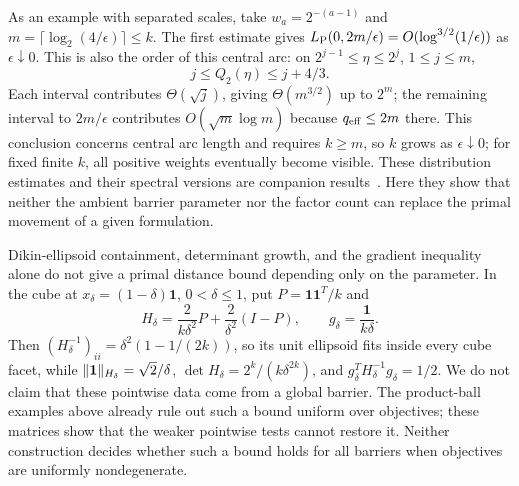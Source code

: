 As an example with separated scales, take $w_a=2^{-(a-1)}$ and
$m=\lceil\log_2(4/\epsilon)\rceil\leq k$. The first estimate gives
$L_{\rm P}(0,2m/\epsilon)=O(\log^{3/2}(1/\epsilon))$ as
$\epsilon\downarrow0$. This is also the order of this central arc:
on $2^{j-1}\leq\eta\leq2^j$, $1\leq j\leq m$,
\[
 j\leq Q_2(\eta)\leq j+4/3.
\]
Each interval contributes $\Theta(\sqrt j)$, giving
$\Theta(m^{3/2})$ up to $2^m$; the remaining interval to
$2m/\epsilon$ contributes $O(\sqrt m\log m)$ because
$q_{\rm eff}\leq2m$ there. This conclusion concerns central arc
length and requires $k\geq m$, so $k$ grows as $\epsilon\downarrow0$;
for fixed finite $k$, all positive weights eventually become visible.
These distribution estimates and their spectral versions are companion
results~\cite[Section~5]{CentralPathCompanion}. Here they show that
neither the ambient barrier parameter nor the factor count can replace
the primal movement of a given formulation.

\begin{remark}
\label{rem:pd-pointwise-obstruction}
Dikin-ellipsoid containment, determinant growth, and the gradient
inequality alone do not give a primal distance bound depending only on
the parameter. In the cube at
$x_\delta=(1-\delta)\mathbf1$, $0<\delta\leq1$, put
$P=\mathbf1\mathbf1^T/k$ and
\[
 H_\delta=\frac{2}{k\delta^2}P+\frac{2}{\delta^2}(I-P),\qquad
 g_\delta=\frac{\mathbf1}{k\delta}.
\]
Then $(H_\delta^{-1})_{ii}=\delta^2(1-1/(2k))$, so its unit
ellipsoid fits inside every cube facet, while
$\lVert \mathbf1\rVert_{H_\delta}=\sqrt2/\delta$,
$\det H_\delta=2^k/(k\delta^{2k})$, and
$g_\delta^TH_\delta^{-1}g_\delta=1/2$.
We do not claim that these pointwise data come from a global barrier.
The product-ball examples above already rule out such a bound uniform
over objectives; these matrices show that the weaker pointwise tests
cannot restore it. Neither construction decides whether such a bound
holds for all barriers when objectives are uniformly nondegenerate.
\end{remark}
